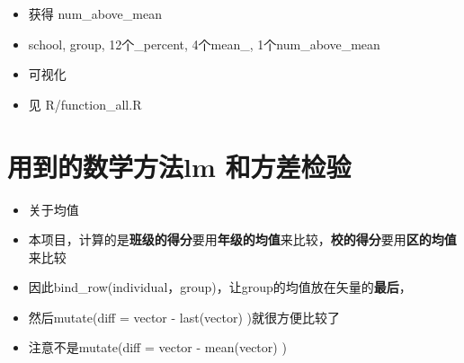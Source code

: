 \documentclass[hyperref, a4paper, UTF8, zihao = -4, linespread = 1]{ctexbook}
\newenvironment{Shaded}{\begin{snugshade}}{\end{snugshade}}
\newcommand{\DataTypeTok}[1]{\textcolor[rgb]{0.13,0.29,0.53}{#1}}
\newcommand{\KeywordTok}[1]{\textcolor[rgb]{0.13,0.29,0.53}{\textbf{#1}}}
\newcommand{\NormalTok}[1]{#1}
\newcommand{\OperatorTok}[1]{\textcolor[rgb]{0.81,0.36,0.00}{\textbf{#1}}}
\newcommand{\StringTok}[1]{\textcolor[rgb]{0.31,0.60,0.02}{#1}}
\providecommand{\tightlist}{%
  \setlength{\itemsep}{0pt}\setlength{\parskip}{0pt}}
\begin{document}
\begin{Shaded}
\end{Shaded}

\begin{itemize}
\tightlist
\item
  获得 num\_above\_mean
\item
  school, group, 12个\_percent, 4个mean\_, 1个num\_above\_mean
\item
  可视化
\item
  见 R/function\_all.R
\end{itemize}

\hypertarget{ux7528ux5230ux7684ux6570ux5b66ux65b9ux6cd5lm-ux548cux65b9ux5deeux68c0ux9a8c}{%
\section{用到的数学方法lm 和方差检验}\label{ux7528ux5230ux7684ux6570ux5b66ux65b9ux6cd5lm-ux548cux65b9ux5deeux68c0ux9a8c}}

\begin{itemize}
\tightlist
\item
  关于均值
\item
  本项目，计算的是\textbf{班级的得分}要用\textbf{年级的均值}来比较，\textbf{校的得分}要用\textbf{区的均值}来比较
\item
  因此bind\_row(individual，group)，让group的均值放在矢量的\textbf{最后}，
\item
  然后mutate(diff = vector - last(vector) )就很方便比较了
\item
  注意不是mutate(diff = vector - mean(vector) )
\end{itemize}
\end{document}
